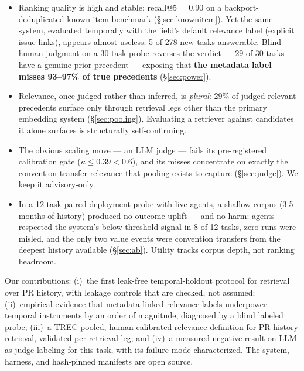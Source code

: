 \documentclass[sigconf,nonacm]{acmart}
\begin{document}
\begin{itemize}
  \item[\textbf{F1.}] Ranking quality is high and stable: recall@5 = 0.90
    on a backport-deduplicated known-item benchmark
    (\S\ref{sec:knownitem}). Yet the same system, evaluated temporally
    with the field's default relevance label (explicit issue links),
    appears almost useless: 5 of 278 new tasks answerable. Blind human
    judgment on a 30-task probe reverses the verdict --- 29 of 30 tasks
    have a genuine prior precedent --- exposing that \textbf{the
    metadata label misses 93--97\% of true precedents}
    (\S\ref{sec:power}).
  \item[\textbf{F2.}] Relevance, once judged rather than inferred, is
    \emph{plural}: 29\% of judged-relevant precedents surface only
    through retrieval legs other than the primary embedding system
    (\S\ref{sec:pooling}). Evaluating a retriever against candidates it
    alone surfaces is structurally self-confirming.
  \item[\textbf{F3.}] The obvious scaling move --- an LLM judge ---
    fails its pre-registered calibration gate ($\kappa \le 0.39 < 0.6$),
    and its misses concentrate on exactly the convention-transfer
    relevance that pooling exists to capture (\S\ref{sec:judge}). We keep
    it advisory-only.
  \item[\textbf{F4.}] In a 12-task paired deployment probe with live
    agents, a shallow corpus (3.5 months of history) produced no outcome
    uplift --- and no harm: agents respected the system's
    below-threshold signal in 8 of 12 tasks, zero runs were misled, and
    the only two value events were convention transfers from the deepest
    history available (\S\ref{sec:ab}). Utility tracks corpus depth, not
    ranking headroom.
\end{itemize}

Our contributions: (i)~the first leak-free temporal-holdout protocol for
retrieval over PR history, with leakage controls that are checked, not
assumed; (ii)~empirical evidence that metadata-linked relevance labels
underpower temporal instruments by an order of magnitude, diagnosed by a
blind labeled probe; (iii)~a TREC-pooled, human-calibrated relevance
definition for PR-history retrieval, validated per retrieval leg; and
(iv)~a measured negative result on LLM-as-judge labeling for this task,
with its failure mode characterized. The system, harness, and hash-pinned
manifests are open source.
\end{document}
